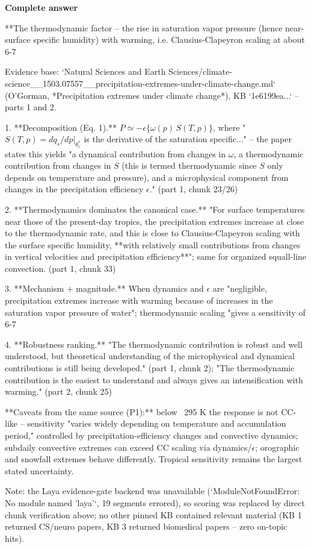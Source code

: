 \documentclass[10pt]{article}
\begin{document}
\textbf{Complete answer}
\begin{AnswerText}
**The thermodynamic factor -- the rise in saturation vapor pressure (hence near-surface specific humidity) with warming, i.e. Clausius-Clapeyron scaling at about 6-7 %

Evidence base: `Natural Sciences and Earth Sciences/climate-science__1503.07557__precipitation-extremes-under-climate-change.md` (O'Gorman, *Precipitation extremes under climate change*), KB `1e6199ea...` -- parts 1 and 2.

1. **Decomposition (Eq. 1).** $P \simeq -\epsilon\{\omega(p)\,S(T,p)\}$, where "$S(T,p)=dq_s/dp|_{\theta_e^*}$ is the derivative of the saturation specific..." -- the paper states this yields "a dynamical contribution from changes in $\omega$, a thermodynamic contribution from changes in $S$ (this is termed thermodynamic since $S$ only depends on temperature and pressure), and a microphysical component from changes in the precipitation efficiency $\epsilon$." (part 1, chunk 23/26)

2. **Thermodynamics dominates the canonical case.** "For surface temperatures near those of the present-day tropics, the precipitation extremes increase at close to the thermodynamic rate, and this is close to Clausius-Clapeyron scaling with the surface specific humidity, **with relatively small contributions from changes in vertical velocities and precipitation efficiency**"; same for organized squall-line convection. (part 1, chunk 33)

3. **Mechanism + magnitude.** When dynamics and $\epsilon$ are "negligible, precipitation extremes increase with warming because of increases in the saturation vapor pressure of water"; thermodynamic scaling "gives a sensitivity of 6-7 %

4. **Robustness ranking.** "The thermodynamic contribution is robust and well understood, but theoretical understanding of the microphysical and dynamical contributions is still being developed." (part 1, chunk 2); "The thermodynamic contribution is the easiest to understand and always gives an intensification with warming." (part 2, chunk 25)

**Caveats from the same source (P1):** below ~295 K the response is not CC-like -- sensitivity "varies widely depending on temperature and accumulation period," controlled by precipitation-efficiency changes and convective dynamics; subdaily convective extremes can exceed CC scaling via dynamics/$\epsilon$; orographic and snowfall extremes behave differently. Tropical sensitivity remains the largest stated uncertainty.

Note: the Laya evidence-gate backend was unavailable (`ModuleNotFoundError: No module named 'laya'`, 19 segments errored), so scoring was replaced by direct chunk verification above; no other pinned KB contained relevant material (KB 1 returned CS/neuro papers, KB 3 returned biomedical papers -- zero on-topic hits).
\end{AnswerText}
\end{document}
